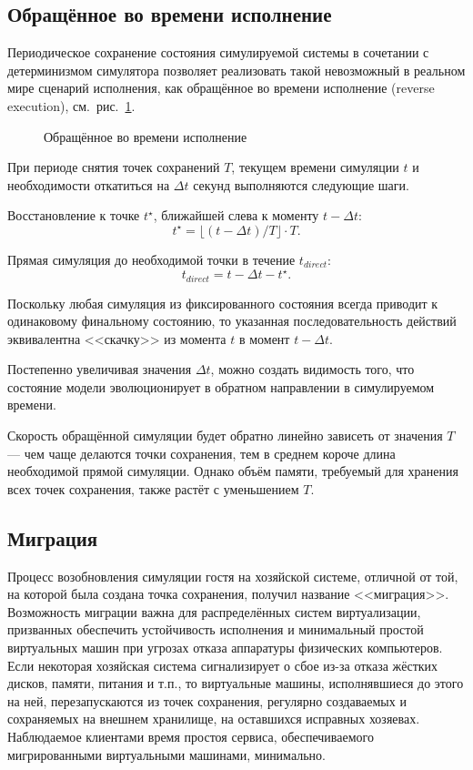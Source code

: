 \subsection[Обращение во времени]{Обращённое во времени исполнение}\label{revexec}

Периодическое сохранение состояния симулируемой системы в сочетании с детерминизмом симулятора позволяет реализовать такой невозможный в реальном мире сценарий исполнения, как обращённое во времени исполнение (\abbr reverse execution), см.~рис.~\ref{fig:reverse-execution}. 

\begin{figure}[htb]
    \centering
    \caption{Обращённое во времени исполнение}
    \label{fig:reverse-execution}
\end{figure}

При периоде снятия точек сохранений $T$, текущем времени симуляции $t$  и необходимости откатиться на $\Delta t$ секунд выполняются следующие шаги.

\begin{enumerate*}
    \item Восстановление к точке $t^\star$, ближайшей слева к моменту $t-\Delta t$:
    $$ t^\star = \lfloor (t - \Delta t) / T \rfloor \cdot T. $$
    \item Прямая симуляция до необходимой точки в течение $t_{direct}$:
    $$t_{direct} = t - \Delta t - t^\star .$$
\end{enumerate*}

Поскольку любая симуляция из фиксированного состояния всегда приводит к одинаковому финальному состоянию, то указанная последовательность действий эквивалентна <<скачку>> из момента $t$ в момент $t - \Delta t$.

Постепенно увеличивая значения $\Delta t$, можно создать видимость того, что состояние модели эволюционирует в обратном направлении в симулируемом времени. 

Скорость обращённой симуляции будет обратно линейно зависеть от значения $T$ --- чем чаще делаются точки сохранения, тем в среднем короче длина необходимой прямой симуляции. Однако объём памяти, требуемый для хранения всех точек сохранения, также растёт с уменьшением $T$.

\subsection{Миграция}

Процесс возобновления симуляции гостя на хозяйской системе, отличной от той, на которой была создана точка сохранения, получил название <<миграция>>. Возможность миграции важна для распределённых систем виртуализации, призванных обеспечить устойчивость исполнения и минимальный простой виртуальных машин при угрозах отказа аппаратуры физических компьютеров. Если некоторая хозяйская система сигнализирует о сбое из-за отказа жёстких дисков, памяти, питания и т.п., то виртуальные машины, исполнявшиеся до этого на ней, перезапускаются из точек сохранения, регулярно создаваемых и сохраняемых на внешнем хранилище, на оставшихся исправных хозяевах. Наблюдаемое клиентами время простоя сервиса, обеспечиваемого мигрированными виртуальными машинами, минимально.

